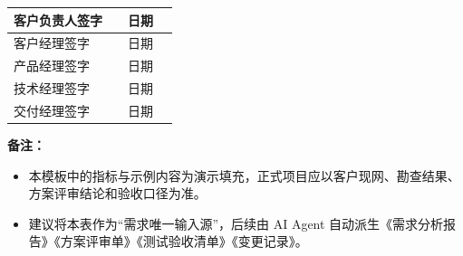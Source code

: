 \documentclass[12pt,a4paper]{ctexart}
\begin{document}
\begin{tabularx}{\textwidth}{|P{3.2cm}|Y|P{3.2cm}|Y|}
\hline
客户负责人签字 & \vspace{1.2cm} & 日期 & \\
\hline
客户经理签字 & \vspace{1.2cm} & 日期 & \\
\hline
产品经理签字 & \vspace{1.2cm} & 日期 & \\
\hline
技术经理签字 & \vspace{1.2cm} & 日期 & \\
\hline
交付经理签字 & \vspace{1.2cm} & 日期 & \\
\hline
\end{tabularx}

\vspace{1em}
\textbf{备注：}
\begin{itemize}[leftmargin=2em]
    \item 本模板中的指标与示例内容为演示填充，正式项目应以客户现网、勘查结果、方案评审结论和验收口径为准。
    \item 建议将本表作为“需求唯一输入源”，后续由 AI Agent 自动派生《需求分析报告》《方案评审单》《测试验收清单》《变更记录》。
\end{itemize}
\end{document}
